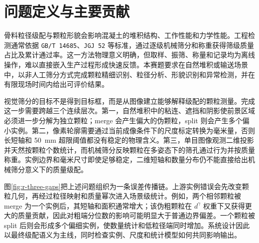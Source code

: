 \section{问题定义与主要贡献}
\label{sec:r-problem}

骨料粒径级配与颗粒形貌会影响混凝土的堆积结构、工作性能和力学性能。工程检测通常依据 \texttt{GB/T 14685}、\texttt{JGJ 52} 等标准，通过逐级机械筛分和称重获得筛级质量占比及累计通过率\cite{gb14685-2022,jgj52-2006}。这一方法物理意义明确，但取样、振筛、称量和记录均为离线操作，难以直接嵌入生产过程形成快速反馈。本赛题要求在自然堆积或输送场景中，以非人工筛分方式完成颗粒精细识别、粒径分析、形貌识别和异常检测，并在有限现场时间内给出可评价结果。

视觉筛分的目标不是得到目标框，而是从图像建立能够解释级配的颗粒测量。完成这一步需要跨越三个连续层次。第一，自然堆积中的粘连、遮挡和阴影使前景区域必须进一步分解为独立颗粒；merge 会产生偏大的伪颗粒，split 则会产生多个偏小实例。第二，像素轮廓需要通过当前成像条件下的尺度标定转换为毫米量，否则长短轴和 50~mm 超限阈值都没有稳定的物理含义。第三，单目图像观测二维投影并天然按颗粒个数统计，而机械筛分反映颗粒在多姿态下的筛孔通过行为并按质量称重。实例边界和毫米尺寸即使足够稳定，二维短轴和数量分布仍不能直接给出机械筛分意义下的质量级配。

图\ref{fig:r-three-gaps}把上述问题组织为一条误差传播链。上游实例错误会先改变颗粒几何，再经过粒径映射和质量幂次进入场景级统计。例如，两个相邻颗粒被 merge 为一个实例后，其短轴和面积通常增大；该伪粗颗粒在 $d^\gamma$ 权重下又获得更大的质量贡献，因此对粗端分位数的影响可能明显大于普通边界偏差。一个颗粒被 split 后则会形成多个偏细实例，使数量统计和低粒径端同时增加。系统设计因此以最终级配语义为主线，同时检查实例、尺度和统计模型如何共同影响输出。

